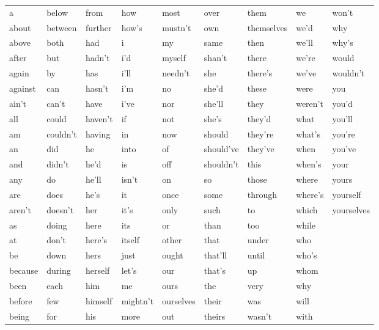 \documentclass[12pt,onecolumn]{IEEEtran}
\begin{document}
	\begin{tabular}{|lllllllll|}
		\hline
		a       & below    & from    & how      & most      & over      & them       & we      & won't      \\
		about   & between  & further & how's    & mustn't   & own       & themselves & we'd    & why        \\
		above   & both     & had     & i        & my        & same      & then       & we'll   & why's      \\
		after   & but      & hadn't  & i'd      & myself    & shan't    & there      & we're   & would      \\
		again   & by       & has     & i'll     & needn't   & she       & there's    & we've   & wouldn't   \\
		against & can      & hasn't  & i'm      & no        & she'd     & these      & were    & you        \\
		ain't   & can't    & have    & i've     & nor       & she'll    & they       & weren't & you'd      \\
		all     & could    & haven't & if       & not       & she's     & they'd     & what    & you'll     \\
		am      & couldn't & having  & in       & now       & should    & they're    & what's  & you're     \\
		an      & did      & he      & into     & of        & should've & they've    & when    & you've     \\
		and     & didn't   & he'd    & is       & off       & shouldn't & this       & when's  & your       \\
		any     & do       & he'll   & isn't    & on        & so        & those      & where   & yours      \\
		are     & does     & he's    & it       & once      & some      & through    & where's & yourself   \\
		aren't  & doesn't  & her     & it's     & only      & such      & to         & which   & yourselves \\
		as      & doing    & here    & its      & or        & than      & too        & while   &            \\
		at      & don't    & here's  & itself   & other     & that      & under      & who     &            \\
		be      & down     & hers    & just     & ought     & that'll   & until      & who's   &            \\
		because & during   & herself & let's    & our       & that's    & up         & whom    &            \\
		been    & each     & him     & me       & ours      & the       & very       & why     &            \\
		before  & few      & himself & mightn't & ourselves & their     & was        & will    &            \\
		being   & for      & his     & more     & out       & theirs    & wasn't     & with    &            \\ \hline
	\end{tabular} 
	
	
\end{document}
